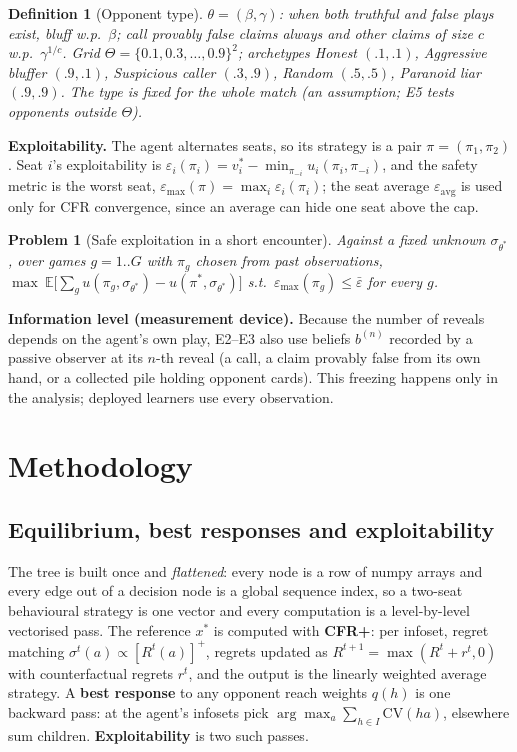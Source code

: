 \documentclass[11pt]{article}
\newtheorem{definition}{Definition}
\newtheorem{problem}{Problem}
\newcommand{\eps}{\varepsilon}
\newcommand{\epsbar}{\bar{\eps}}
\newcommand{\emax}{\eps_{\max}}
\begin{document}
\begin{definition}[Opponent type]
$\theta=(\beta,\gamma)$: when both truthful and false plays exist, bluff w.p.\ $\beta$; call provably false claims always and other claims of size $c$ w.p.\ $\gamma^{1/c}$. Grid $\Theta=\{0.1,0.3,\dots,0.9\}^2$; archetypes Honest $(.1,.1)$, Aggressive bluffer $(.9,.1)$, Suspicious caller $(.3,.9)$, Random $(.5,.5)$, Paranoid liar $(.9,.9)$. The type is fixed for the whole match (an assumption; E5 tests opponents outside $\Theta$).
\end{definition}
\textbf{Exploitability.} The agent alternates seats, so its strategy is a pair $\pi=(\pi_1,\pi_2)$. Seat $i$'s exploitability is $\eps_i(\pi_i)=v_i^*-\min_{\pi_{-i}}u_i(\pi_i,\pi_{-i})$, and the safety metric is the worst seat, $\emax(\pi)=\max_i\eps_i(\pi_i)$; the seat average $\eps_{\mathrm{avg}}$ is used only for CFR convergence, since an average can hide one seat above the cap.

\begin{problem}[Safe exploitation in a short encounter]
Against a fixed unknown $\sigma_{\theta^*}$, over games $g=1..G$ with $\pi_g$ chosen from past observations,
$\max\ \mathbb E\big[\sum_g u(\pi_g,\sigma_{\theta^*})-u(\pi^*,\sigma_{\theta^*})\big]$ s.t.\ $\emax(\pi_g)\le\epsbar$ for every $g$.
\end{problem}
\textbf{Information level (measurement device).} Because the number of reveals depends on the agent's own play, E2--E3 also use beliefs $b^{(n)}$ recorded by a passive observer at its $n$-th reveal (a call, a claim provably false from its own hand, or a collected pile holding opponent cards). This freezing happens only in the analysis; deployed learners use every observation.

\section{Methodology}
\subsection{Equilibrium, best responses and exploitability}
The tree is built once and \emph{flattened}: every node is a row of numpy arrays and every edge out of a decision node is a global sequence index, so a two-seat behavioural strategy is one vector and every computation is a level-by-level vectorised pass. The reference $x^*$ is computed with \textbf{CFR+}: per infoset, regret matching $\sigma^t(a)\propto[R^t(a)]^+$, regrets updated as $R^{t+1}=\max(R^t+r^t,0)$ with counterfactual regrets $r^t$, and the output is the linearly weighted average strategy. A \textbf{best response} to any opponent reach weights $q(h)$ is one backward pass: at the agent's infosets pick $\arg\max_a\sum_{h\in I}\mathrm{CV}(ha)$, elsewhere sum children. \textbf{Exploitability} is two such passes.
\end{document}
